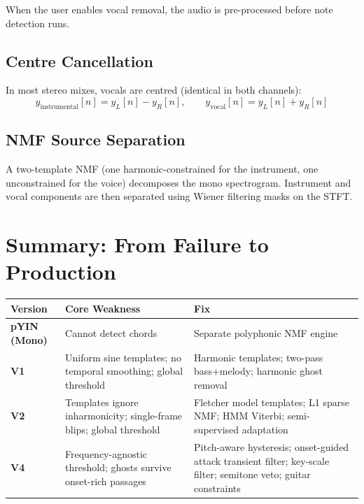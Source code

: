 \documentclass[12pt, a4paper]{article}
\begin{document}
When the user enables vocal removal, the audio is pre-processed before
note detection runs.

\subsection{Centre Cancellation}

In most stereo mixes, vocals are centred (identical in both channels):
\begin{equation}
  y_{\text{instrumental}}[n] = y_L[n] - y_R[n], \qquad
  y_{\text{vocal}}[n] = y_L[n] + y_R[n]
\end{equation}

\subsection{NMF Source Separation}

A two-template NMF (one harmonic-constrained for the instrument, one
unconstrained for the voice) decomposes the mono spectrogram. Instrument
and vocal components are then separated using Wiener filtering masks on
the STFT.

\section{Summary: From Failure to Production}

\begin{center}
\begin{tabular}{lp{4.5cm}p{5.5cm}}
  \toprule
  Version & Core Weakness & Fix \\
  \midrule
  \textbf{pYIN (Mono)} &
    Cannot detect chords &
    Separate polyphonic NMF engine \\[4pt]
  \textbf{V1} &
    Uniform sine templates; no temporal smoothing; global threshold &
    Harmonic templates; two-pass bass+melody; harmonic ghost removal \\[4pt]
  \textbf{V2} &
    Templates ignore inharmonicity; single-frame blips; global threshold &
    Fletcher model templates; L1 sparse NMF; HMM Viterbi; semi-supervised adaptation \\[4pt]
  \textbf{V4} &
    Frequency-agnostic threshold; ghosts survive onset-rich passages &
    Pitch-aware hysteresis; onset-guided attack transient filter;
    key-scale filter; semitone veto; guitar constraints \\
  \bottomrule
\end{tabular}
\end{center}
\end{document}
